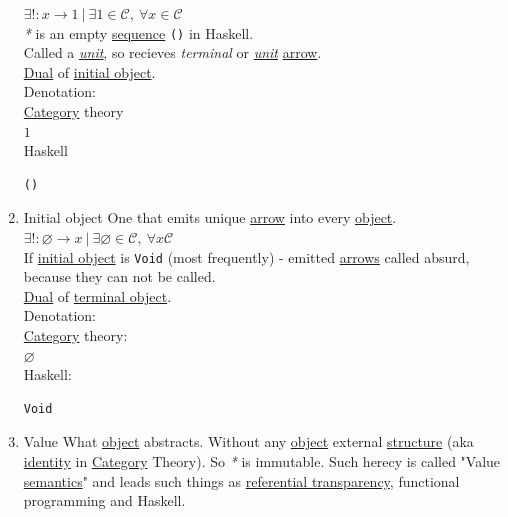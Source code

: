 \documentclass[a4paper,14pt,oneside]{book}
\begin{document}
\begin{enumerate}
\(\exists ! : x \to 1 \ | \ \exists 1 \in \mathcal{C}, \ \forall x \in \mathcal{C}\)\\

\emph{*} is an empty \hyperref[orgc436f93]{sequence} \texttt{()} in Haskell.\\

Called a \emph{\hyperref[org2f67cc5]{unit}}, so recieves \emph{terminal} or \emph{\hyperref[org2f67cc5]{unit}} \hyperref[orga07bb6a]{arrow}.\\

\hyperref[org90a5017]{Dual} of \hyperref[orgc327344]{initial object}.\\

Denotation:\\

\hyperref[org69f32f1]{Category} theory\\
\(1\)\\

Haskell\\
\begin{verbatim}
()
\end{verbatim}

\item \label{orgc327344}Initial object
\label{sec:org42f40d0}
One that emits unique \hyperref[orga07bb6a]{arrow} into every \hyperref[orgf695f6d]{object}.\\

\(\exists ! : \varnothing \to x \ | \ \exists \varnothing \in \mathcal{C}, \ \forall x \mathcal{C}\)\\

If \hyperref[orgc327344]{initial object} is \texttt{Void} (most frequently) - emitted \hyperref[orgcd45d42]{arrows} called absurd, because they can not be called.\\

\hyperref[org90a5017]{Dual} of \hyperref[org7ae5932]{terminal object}.\\

Denotation:\\

\hyperref[org69f32f1]{Category} theory:\\
\(\varnothing\)\\

Haskell:\\
\begin{verbatim}
Void
\end{verbatim}

\item Value
\label{sec:org06ef758}
What \hyperref[orgf695f6d]{object} abstracts. Without any \hyperref[orgf695f6d]{object} external \hyperref[org638bf3c]{structure} (aka \hyperref[org0614e8c]{identity} in \hyperref[org69f32f1]{Category} Theory). So \emph{*} is immutable. Such herecy is called "Value \hyperref[org457e52f]{semantics}" and leads such things as \hyperref[orgbbc061a]{referential transparency}, functional programming and Haskell.\\


\end{enumerate}
\end{document}
